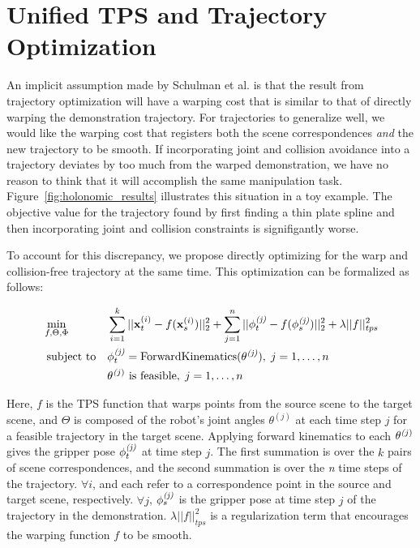 \section{Unified TPS and Trajectory Optimization}
An implicit assumption made by Schulman et al. is that the result from trajectory optimization will have a warping cost that is similar to that of directly warping the demonstration trajectory. For trajectories to generalize well, we would like the warping cost that registers both the scene correspondences \emph{and} the new trajectory to be smooth. If incorporating joint and collision avoidance into a trajectory deviates by too much from the warped demonstration, we have no reason to think that it will accomplish the same manipulation task. Figure~\ref{fig:holonomic_results} illustrates this situation in a toy example. The objective value for the trajectory found by first finding a thin plate spline and then incorporating joint and collision constraints is signifigantly worse.

To account for this discrepancy, we propose directly optimizing for the warp and collision-free trajectory at the same time. This optimization can be formalized as follows:

\begin{equation}
\begin{aligned}
  & \min_{f,\Theta,\Phi}
  & & \sum_{i=1}^k ||\mathbf{x}_t^{(i)} - f(\mathbf{x}_s^{(i)})||_2^2 + \sum_{j=1}^n ||\mathbf{\phi}_t^{\emph{(j)}} - f(\mathbf{\phi}_s^{\emph{(j)}})||_2^2 + \lambda ||f||_{tps}^2 \\
  & \text{ subject to}
  & & \mathbf{\phi}_t^{\emph{(j)}} = \text{ForwardKinematics}(\mathbf{\theta}^{\emph{(j)}}), \; j = 1, \ldots, n \\
  &
  & & \mathbf{\theta}^{\emph(j)} \text{ is feasible}, \; j = 1, \ldots, n
\end{aligned}
\end{equation}

Here, $f$ is the TPS function that warps points from the source scene to the target scene, and $\Theta$ is composed of the robot's joint angles $\theta^{(j)}$ at each time step $j$ for a feasible trajectory in the target scene. Applying forward kinematics to each $\mathbf{\theta}^{\emph(j)}$ gives the gripper pose $\mathbf{\phi}_t^{\emph{(j)}}$ at time step $j$. The first summation is over the $k$ pairs of scene correspondences, and the second summation is over the \emph{n} time steps of the trajectory. $\forall i$,  and  each refer to a correspondence point in the source and target scene, respectively. $\forall j$, $\mathbf{\phi}_s^{\emph{(j)}}$ is the gripper pose at time step $j$ of the trajectory in the demonstration. $\lambda ||f||_{tps}^2$ is a regularization term that encourages the warping function $f$ to be smooth.

